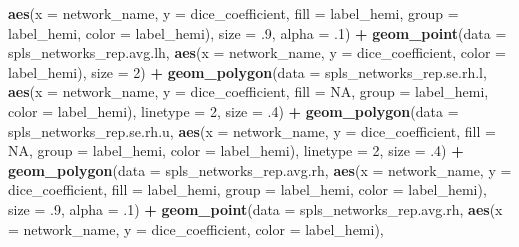 \documentclass[
]{article}
\newenvironment{Shaded}{\begin{snugshade}}{\end{snugshade}}
\newcommand{\DataTypeTok}[1]{\textcolor[rgb]{0.13,0.29,0.53}{#1}}
\newcommand{\DecValTok}[1]{\textcolor[rgb]{0.00,0.00,0.81}{#1}}
\newcommand{\FloatTok}[1]{\textcolor[rgb]{0.00,0.00,0.81}{#1}}
\newcommand{\KeywordTok}[1]{\textcolor[rgb]{0.13,0.29,0.53}{\textbf{#1}}}
\newcommand{\NormalTok}[1]{#1}
\newcommand{\OperatorTok}[1]{\textcolor[rgb]{0.81,0.36,0.00}{\textbf{#1}}}
\newcommand{\OtherTok}[1]{\textcolor[rgb]{0.56,0.35,0.01}{#1}}
\newcommand{\StringTok}[1]{\textcolor[rgb]{0.31,0.60,0.02}{#1}}
\begin{document}
\begin{Shaded}
\begin{Highlighting}[]
{{{{{{{{{{{{               \KeywordTok{aes}\NormalTok{(}\DataTypeTok{x =}\NormalTok{ network_name, }\DataTypeTok{y =}\NormalTok{ dice_coefficient, }\DataTypeTok{fill =}\NormalTok{ label_hemi, }\DataTypeTok{group =}\NormalTok{ label_hemi, }
                   \DataTypeTok{color =}\NormalTok{ label_hemi), }
               \DataTypeTok{size =} \FloatTok{.9}\NormalTok{, }\DataTypeTok{alpha =} \FloatTok{.1}\NormalTok{) }\OperatorTok{+}
\StringTok{  }\KeywordTok{geom_point}\NormalTok{(}\DataTypeTok{data =}\NormalTok{ spls_networks_rep.avg.lh, }
             \KeywordTok{aes}\NormalTok{(}\DataTypeTok{x =}\NormalTok{ network_name, }\DataTypeTok{y =}\NormalTok{ dice_coefficient, }\DataTypeTok{color =}\NormalTok{ label_hemi), }
             \DataTypeTok{size =} \DecValTok{2}\NormalTok{) }\OperatorTok{+}\StringTok{ }
\StringTok{  }
\StringTok{  }
\StringTok{  }\KeywordTok{geom_polygon}\NormalTok{(}\DataTypeTok{data =}\NormalTok{ spls_networks_rep.se.rh.l, }
               \KeywordTok{aes}\NormalTok{(}\DataTypeTok{x =}\NormalTok{ network_name, }\DataTypeTok{y =}\NormalTok{ dice_coefficient, }\DataTypeTok{fill =} \OtherTok{NA}\NormalTok{, }\DataTypeTok{group =}\NormalTok{ label_hemi, }\DataTypeTok{color =}\NormalTok{ label_hemi), }
               \DataTypeTok{linetype =} \DecValTok{2}\NormalTok{, }\DataTypeTok{size =} \FloatTok{.4}\NormalTok{) }\OperatorTok{+}\StringTok{ }
\StringTok{  }\KeywordTok{geom_polygon}\NormalTok{(}\DataTypeTok{data =}\NormalTok{ spls_networks_rep.se.rh.u, }
               \KeywordTok{aes}\NormalTok{(}\DataTypeTok{x =}\NormalTok{ network_name, }\DataTypeTok{y =}\NormalTok{ dice_coefficient, }\DataTypeTok{fill =} \OtherTok{NA}\NormalTok{, }\DataTypeTok{group =}\NormalTok{ label_hemi, }\DataTypeTok{color =}\NormalTok{ label_hemi), }
               \DataTypeTok{linetype =} \DecValTok{2}\NormalTok{, }\DataTypeTok{size =} \FloatTok{.4}\NormalTok{) }\OperatorTok{+}\StringTok{ }
\StringTok{  }\KeywordTok{geom_polygon}\NormalTok{(}\DataTypeTok{data =}\NormalTok{ spls_networks_rep.avg.rh, }
               \KeywordTok{aes}\NormalTok{(}\DataTypeTok{x =}\NormalTok{ network_name, }\DataTypeTok{y =}\NormalTok{ dice_coefficient, }\DataTypeTok{fill =}\NormalTok{ label_hemi, }\DataTypeTok{group =}\NormalTok{ label_hemi, }
                   \DataTypeTok{color =}\NormalTok{ label_hemi), }
               \DataTypeTok{size =} \FloatTok{.9}\NormalTok{, }\DataTypeTok{alpha =} \FloatTok{.1}\NormalTok{) }\OperatorTok{+}
\StringTok{  }\KeywordTok{geom_point}\NormalTok{(}\DataTypeTok{data =}\NormalTok{ spls_networks_rep.avg.rh, }
             \KeywordTok{aes}\NormalTok{(}\DataTypeTok{x =}\NormalTok{ network_name, }\DataTypeTok{y =}\NormalTok{ dice_coefficient, }\DataTypeTok{color =}\NormalTok{ label_hemi), }
}}}}}}}}}}}}
\end{Highlighting}
\end{Shaded}
\end{document}

